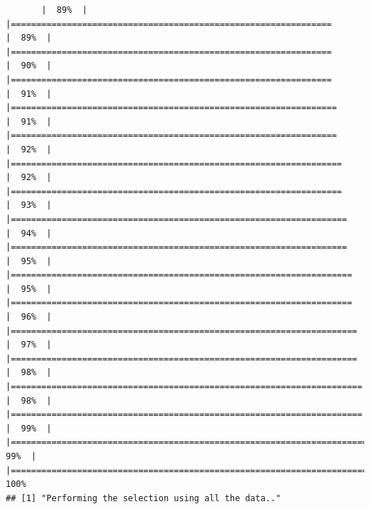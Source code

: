 \documentclass[
]{article}
\begin{document}
\begin{verbatim}
       |  89%  |                                                                              |===============================================================       |  89%  |                                                                              |===============================================================       |  90%  |                                                                              |===============================================================       |  91%  |                                                                              |================================================================      |  91%  |                                                                              |================================================================      |  92%  |                                                                              |=================================================================     |  92%  |                                                                              |=================================================================     |  93%  |                                                                              |==================================================================    |  94%  |                                                                              |==================================================================    |  95%  |                                                                              |===================================================================   |  95%  |                                                                              |===================================================================   |  96%  |                                                                              |====================================================================  |  97%  |                                                                              |====================================================================  |  98%  |                                                                              |===================================================================== |  98%  |                                                                              |===================================================================== |  99%  |                                                                              |======================================================================|  99%  |                                                                              |======================================================================| 100%
## [1] "Performing the selection using all the data.."
\end{verbatim}
\end{document}
